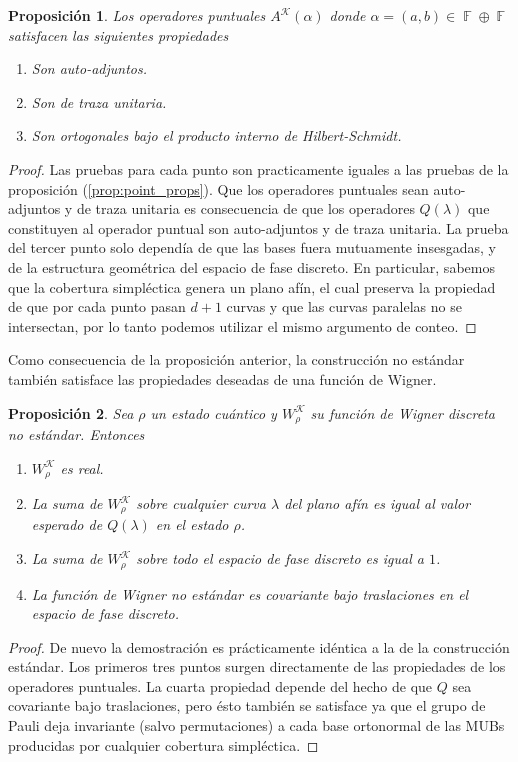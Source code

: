 \documentclass[a4paper,11pt]{report}
\DeclareMathOperator{\F}{\mathbb{F}}
\newtheorem{proposition}{Proposición}
\begin{document}
  \begin{proposition}
    Los operadores puntuales $A^{\mathcal K}(\alpha)$ donde
    $\alpha = (a,b) \in \F \oplus \F$ satisfacen las
    siguientes propiedades
    \begin{enumerate}
      \item Son auto-adjuntos.
      \item Son de traza unitaria.
      \item Son ortogonales bajo el producto interno de
        Hilbert-Schmidt.
    \end{enumerate}
  \end{proposition}
  \begin{proof}
    Las pruebas para cada punto son practicamente iguales a
    las pruebas de la proposición (\ref{prop:point_props}).
    Que los operadores puntuales sean auto-adjuntos y de
    traza unitaria es consecuencia de que los operadores
    $Q(\lambda)$ que constituyen al operador puntual son
    auto-adjuntos y de traza unitaria. La prueba del tercer
    punto solo dependía de que las bases fuera mutuamente
    insesgadas, y de la estructura geométrica del espacio de
    fase discreto. En particular, sabemos que la cobertura
    simpléctica genera un plano afín, el cual preserva la
    propiedad de que por cada punto pasan $d+1$ curvas y que
    las curvas paralelas no se intersectan, por lo tanto
    podemos utilizar el mismo argumento de conteo.
  \end{proof}
  Como consecuencia de la proposición anterior, la
  construcción no estándar también satisface las propiedades
  deseadas de una función de Wigner.
  \begin{proposition}
    Sea $\rho$ un estado cuántico y $W_\rho^{\mathcal K}$ su
    función de Wigner discreta no estándar. Entonces
    \begin{enumerate}
      \item $W_\rho^{\mathcal K}$ es real.
      \item La suma de $W_\rho^{\mathcal K}$ sobre cualquier
        curva $\lambda$ del plano afín es igual al valor
        esperado de $Q(\lambda)$ en el estado $\rho$.
      \item La suma de $W_\rho^{\mathcal K}$ sobre todo el
        espacio de fase discreto es igual a $1$.
      \item La función de Wigner no estándar es covariante
        bajo traslaciones en el espacio de fase discreto.
    \end{enumerate}
  \end{proposition}
  \begin{proof}
    De nuevo la demostración es prácticamente idéntica a la
    de la construcción estándar. Los primeros tres puntos
    surgen directamente de las propiedades de los operadores
    puntuales. La cuarta propiedad depende del hecho de que
    $Q$ sea covariante bajo traslaciones, pero ésto también
    se satisface ya que el grupo de Pauli deja invariante
    (salvo permutaciones) a cada base ortonormal de las MUBs
    producidas por cualquier cobertura simpléctica.
  \end{proof}
\end{document}
